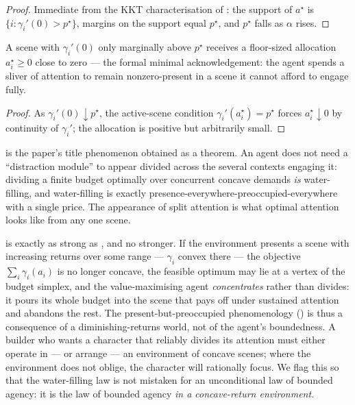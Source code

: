 \documentclass[11pt,twocolumn,a4paper]{article}
\newcommand{\att}{\alpha}            %
\newcommand{\price}{p^{\star}}       %
\newcommand{\alloc}{a}               %
\begin{document}
\begin{proof}
Immediate from the KKT characterisation of : the
support of $\alloc^\star$ is $\{i:\gamma_i'(0)>\price\}$, margins on the
support equal $\price$, and $\price$ falls as $\att$ rises.
\end{proof}

\begin{corollary}
\label{cor:token}
A scene with $\gamma_i'(0)$ only marginally above $\price$ receives a
floor-sized allocation $a_i^\star\ge0$ close to zero --- the formal
minimal acknowledgement: the agent spends a sliver of attention to remain
nonzero-present in a scene it cannot afford to engage fully.
\end{corollary}

\begin{proof}
As $\gamma_i'(0)\downarrow\price$, the active-scene condition
$\gamma_i'(a_i^\star)=\price$ forces $a_i^\star\downarrow0$ by continuity
of $\gamma_i'$; the allocation is positive but arbitrarily small.
\end{proof}

\begin{remark}
\label{rem:split}
 is the paper's title phenomenon obtained as a
theorem. An agent does not need a ``distraction module'' to appear divided
across the several contexts engaging it: dividing a finite budget
optimally over concurrent concave demands \emph{is} water-filling, and
water-filling is exactly presence-everywhere-preoccupied-everywhere with a
single price. The appearance of split attention is what optimal attention
looks like from any one scene.
\end{remark}

\begin{remark}
\label{rem:nonconcave}
 is exactly as strong as , and no
stronger. If the environment presents a scene with increasing returns over
some range --- $\gamma_i$ convex there --- the objective
$\sum_i\gamma_i(a_i)$ is no longer concave, the feasible optimum may lie at
a vertex of the budget simplex, and the value-maximising agent
\emph{concentrates} rather than divides: it pours its whole budget into the
scene that pays off under sustained attention and abandons the rest. The
present-but-preoccupied phenomenology () is thus a
consequence of a diminishing-returns world, not of the agent's boundedness.
A builder who wants a character that reliably divides its attention must
either operate in --- or arrange --- an environment of concave scenes; where
the environment does not oblige, the character will rationally focus. We
flag this so that the water-filling law is not mistaken for an unconditional
law of bounded agency: it is the law of bounded agency \emph{in a
concave-return environment}.
\end{remark}
\end{document}

